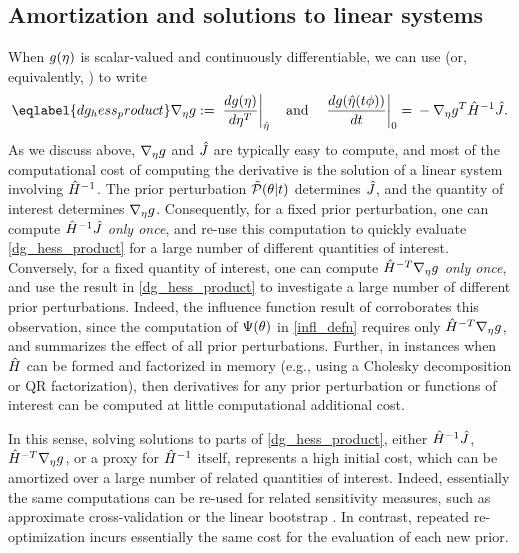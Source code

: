 \subsection{Amortization and solutions to linear systems}

When $g(\eta)$ is scalar-valued and continuously differentiable, we can use
 (or, equivalently, ) to write
%
\begin{align}\eqlabel{dg_hess_product}
%
\nabla_\eta \g :={} \fracat{d g(\eta)}{ d \eta^T}{\etaopt}
\mathand
\fracat{d g(\etaopt(\t \phi))}{d \t}{0} ={}
- \nabla_\eta \g^T \hessopt^{-1} \crosshessian.
%
\end{align}
%
As we discuss above, $\nabla_\eta g$ and $\hat J$ are typically easy to
compute, and most of the computational cost of computing the derivative
is the solution of a linear system involving $\hat{H}^{-1}$.  The
prior perturbation $\tilde{\mathcal{P}}(\theta \vert t)$ determines $\hat J$,
and the quantity of interest determines $\nabla_\eta g$.  Consequently,
for a fixed prior perturbation, one can compute $\hat{H}^{-1} \hat J$
{\em only once}, and re-use this computation to quickly evaluate
\eqref{dg_hess_product} for a large number of different quantities of interest.
Conversely, for a fixed quantity of interest, one can compute
$\hat{H}^{-T} \nabla_\eta g$ {\em only once}, and use the result
in \eqref{dg_hess_product} to investigate a large number of different prior
perturbations.
%
Indeed, the influence function result of 
corroborates this observation, since the computation of $\Psi(\theta)$ in
\eqref{infl_defn} requires only $\hat{H}^{-T} \nabla_\eta g$, and summarizes
the effect of all prior perturbations.
%
Further, in instances when $\hat{H}$ can be formed and factorized in memory
(e.g., using a Cholesky decomposition or QR factorization), then derivatives for
any prior perturbation or functions of interest can be computed at little
computational additional cost.

In this sense, solving solutions to parts of \eqref{dg_hess_product}, either
$\hat{H}^{-1} \hat J$, $\hat{H}^{-T} \nabla_\eta g$, or a proxy for
$\hat{H}^{-1}$ itself, represents a high initial cost, which can be amortized
over a large number of related quantities of interest.  Indeed, essentially the
same computations can be re-used for related sensitivity measures, such as
approximate cross-validation or the linear bootstrap \citep{giordano:2019:swiss,
giordano:2017:linearboot}.  In contrast, repeated re-optimization incurs
essentially the same cost for the evaluation of each new prior.

